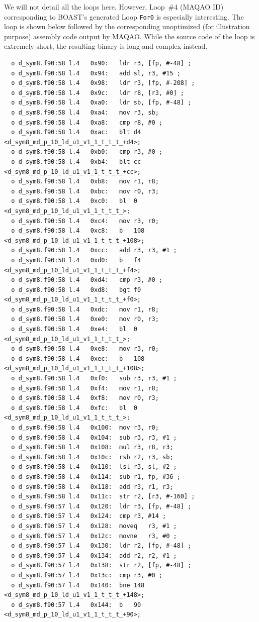 \documentclass[11pt, a4paper, twoside]{montblanc2}
\begin{document}
We will not detail all the loops here. However, Loop~\#4 (MAQAO ID) corresponding 
to BOAST's generated Loop \verb|For0| is especially interesting. The loop is 
shown below followed by the corresponding unoptimized (for illustration purpose) 
assembly code output by MAQAO. While the source code of the loop is extremely 
short, the resulting binary is long and complex instead.



\begin{footnotesize}
\begin{verbatim}
  o d_sym8.f90:58 l.4   0x90:	ldr	r3, [fp, #-48] ;
  o d_sym8.f90:58 l.4   0x94:	add	sl, r3, #15 ;
  o d_sym8.f90:58 l.4   0x98:	ldr	r3, [fp, #-208] ;
  o d_sym8.f90:58 l.4   0x9c:	ldr	r8, [r3, #0] ;
  o d_sym8.f90:58 l.4   0xa0:	ldr	sb, [fp, #-48] ;
  o d_sym8.f90:58 l.4   0xa4:	mov	r3, sb;
  o d_sym8.f90:58 l.4   0xa8:	cmp	r8, #0 ;
  o d_sym8.f90:58 l.4   0xac:	blt	d4 <d_sym8_md_p_10_ld_u1_v1_1_t_t_t_+d4>;
  o d_sym8.f90:58 l.4   0xb0:	cmp	r3, #0 ;
  o d_sym8.f90:58 l.4   0xb4:	blt	cc <d_sym8_md_p_10_ld_u1_v1_1_t_t_t_+cc>;
  o d_sym8.f90:58 l.4   0xb8:	mov	r1, r8;
  o d_sym8.f90:58 l.4   0xbc:	mov	r0, r3;
  o d_sym8.f90:58 l.4   0xc0:	bl	0 <d_sym8_md_p_10_ld_u1_v1_1_t_t_t_>;
  o d_sym8.f90:58 l.4   0xc4:	mov	r3, r0;
  o d_sym8.f90:58 l.4   0xc8:	b	108 <d_sym8_md_p_10_ld_u1_v1_1_t_t_t_+108>;
  o d_sym8.f90:58 l.4   0xcc:	add	r3, r3, #1 ;
  o d_sym8.f90:58 l.4   0xd0:	b	f4 <d_sym8_md_p_10_ld_u1_v1_1_t_t_t_+f4>;
  o d_sym8.f90:58 l.4   0xd4:	cmp	r3, #0 ;
  o d_sym8.f90:58 l.4   0xd8:	bgt	f0 <d_sym8_md_p_10_ld_u1_v1_1_t_t_t_+f0>;
  o d_sym8.f90:58 l.4   0xdc:	mov	r1, r8;
  o d_sym8.f90:58 l.4   0xe0:	mov	r0, r3;
  o d_sym8.f90:58 l.4   0xe4:	bl	0 <d_sym8_md_p_10_ld_u1_v1_1_t_t_t_>;
  o d_sym8.f90:58 l.4   0xe8:	mov	r3, r0;
  o d_sym8.f90:58 l.4   0xec:	b	108 <d_sym8_md_p_10_ld_u1_v1_1_t_t_t_+108>;
  o d_sym8.f90:58 l.4   0xf0:	sub	r3, r3, #1 ;
  o d_sym8.f90:58 l.4   0xf4:	mov	r1, r8;
  o d_sym8.f90:58 l.4   0xf8:	mov	r0, r3;
  o d_sym8.f90:58 l.4   0xfc:	bl	0 <d_sym8_md_p_10_ld_u1_v1_1_t_t_t_>;
  o d_sym8.f90:58 l.4   0x100:	mov	r3, r0;
  o d_sym8.f90:58 l.4   0x104:	sub	r3, r3, #1 ;
  o d_sym8.f90:58 l.4   0x108:	mul	r3, r8, r3;
  o d_sym8.f90:58 l.4   0x10c:	rsb	r2, r3, sb;
  o d_sym8.f90:58 l.4   0x110:	lsl	r3, sl, #2 ;
  o d_sym8.f90:58 l.4   0x114:	sub	r1, fp, #36 ;
  o d_sym8.f90:58 l.4   0x118:	add	r3, r1, r3;
  o d_sym8.f90:58 l.4   0x11c:	str	r2, [r3, #-160] ;
  o d_sym8.f90:57 l.4   0x120:	ldr	r3, [fp, #-48] ;
  o d_sym8.f90:57 l.4   0x124:	cmp	r3, #14 ;
  o d_sym8.f90:57 l.4   0x128:	moveq	r3, #1 ;
  o d_sym8.f90:57 l.4   0x12c:	movne	r3, #0 ;
  o d_sym8.f90:57 l.4   0x130:	ldr	r2, [fp, #-48] ;
  o d_sym8.f90:57 l.4   0x134:	add	r2, r2, #1 ;
  o d_sym8.f90:57 l.4   0x138:	str	r2, [fp, #-48] ;
  o d_sym8.f90:57 l.4   0x13c:	cmp	r3, #0 ;
  o d_sym8.f90:57 l.4   0x140:	bne	148 <d_sym8_md_p_10_ld_u1_v1_1_t_t_t_+148>;
  o d_sym8.f90:57 l.4   0x144:	b	90 <d_sym8_md_p_10_ld_u1_v1_1_t_t_t_+90>;

\end{verbatim}
\end{footnotesize}
\end{document}
